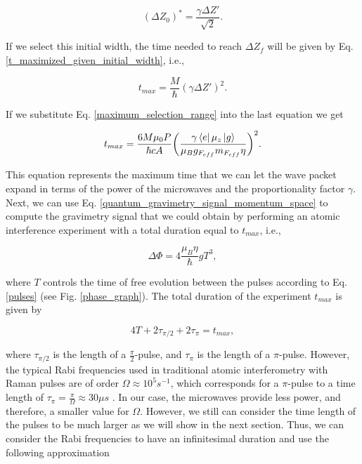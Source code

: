 \documentclass{article}
\begin{document}
\begin{equation}
    (\Delta Z_{0})^{\ast} = \frac{\gamma \Delta Z'}{\sqrt{2}}.
\end{equation}

If we select this initial width, the time needed to reach $\Delta Z_{f}$ will be given by Eq. \ref{t_maximized_given_initial_width}, i.e.,

\begin{equation}
    t_{max} = \frac{M}{\hbar} (\gamma \Delta Z')^2.
\end{equation}

If we substitute Eq. \ref{maximum_selection_range} into the last equation we get

\begin{equation}\label{total_experiment_time}
    t_{max} = \frac{6 M \mu_{0} P}{\hbar c A} \bigg(\frac{ \gamma  \bra{e} \mu_{z} \ket{g}}{\mu_{B} g_{F_{eff}} m_{F_{eff}} \eta}\bigg)^{2}.
\end{equation}

This equation represents the maximum time that we can let the wave packet expand in terms of the power of the microwaves and the proportionality factor $\gamma$. Next, we can use Eq. \ref{quantum_gravimetry_signal_momentum_space} to compute the gravimetry signal that we could obtain by performing an atomic interference experiment with a total duration equal to $t_{max}$, i.e., 

\begin{equation}\label{gravimetry_signal_T}
    \Delta \Phi = 4 \frac{\mu_{B} \eta }{\hbar} g T^{3},
\end{equation}

where $T$ controls the time of free evolution between the pulses according to Eq. \ref{pulses} (see Fig. \ref{phase_graph}). The total duration of the experiment $t_{max}$ is given by

\begin{equation}
    4 T + 2\tau_{\pi/2} + 2\tau_{\pi} = t_{max},
\end{equation}

where $\tau_{\pi/2}$ is the length of a $\frac{\pi}{2}$-pulse, and $\tau_{\pi}$ is the length of a $\pi$-pulse. However, the typical Rabi frequencies used in traditional atomic interferometry with Raman pulses are of order $\Omega \approx 10^5 s^{-1}$, which corresponds for a $\pi$-pulse to a time length of $\tau_{\pi} = \frac{\pi}{\Omega} \approx 30 \mu s$ \cite{Menoret2018}. In our case, the microwaves provide less power, and therefore, a smaller value for $\Omega$. However, we still can consider the time length of the pulses to be much larger as we will show in the next section. Thus, we can consider the Rabi frequencies to have an infinitesimal duration and use the following approximation
\end{document}
